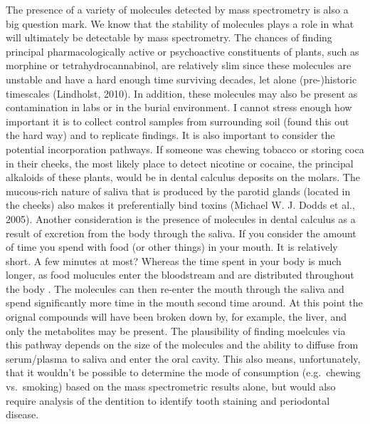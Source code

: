 \documentclass[
  letterpaper,
]{book}
\begin{document}
The presence of a variety of molecules detected by mass spectrometry is
also a big question mark. We know that the stability of molecules plays
a role in what will ultimately be detectable by mass spectrometry. The
chances of finding principal pharmacologically active or psychoactive
constituents of plants, such as morphine or tetrahydrocannabinol, are
relatively slim since these molecules are unstable and have a hard
enough time surviving decades, let alone (pre-)historic timescales
(Lindholst, 2010). In addition, these molecules may also be present as
contamination in labs or in the burial environment. I cannot stress
enough how important it is to collect control samples from surrounding
soil (found this out the hard way) and to replicate findings. It is also
important to consider the potential incorporation pathways. If someone
was chewing tobacco or storing coca in their cheeks, the most likely
place to detect nicotine or cocaine, the principal alkaloids of these
plants, would be in dental calculus deposits on the molars. The
mucous-rich nature of saliva that is produced by the parotid glands
(located in the cheeks) also makes it preferentially bind toxins
(Michael W. J. Dodds et al., 2005). Another consideration is the
presence of molecules in dental calculus as a result of excretion from
the body through the saliva. If you consider the amount of time you
spend with food (or other things) in your mouth. It is relatively short.
A few minutes at most? Whereas the time spent in your body is much
longer, as food molucules enter the bloodstream and are distributed
throughout the body . The molecules can then re-enter the mouth through
the saliva and spend significantly more time in the mouth second time
around. At this point the orignal compounds will have been broken down
by, for example, the liver, and only the metabolites may be present. The
plausibility of finding moelcules via this pathway depends on the size
of the molecules and the ability to diffuse from serum/plasma to saliva
and enter the oral cavity. This also means, unfortunately, that it
wouldn't be possible to determine the mode of consumption (e.g.~chewing
vs.~smoking) based on the mass spectrometric results alone, but would
also require analysis of the dentition to identify tooth staining and
periodontal disease.
\end{document}
